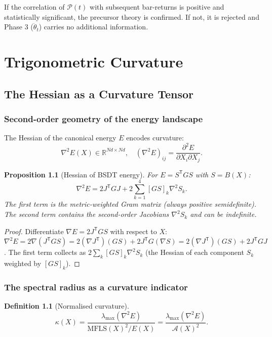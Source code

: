 \documentclass[11pt,a4paper,openany]{book}
\newtheorem{proposition}[theorem]{Proposition}
\theoremstyle{definition}
\newtheorem{definition}[theorem]{Definition}
\newcommand{\R}{\mathbb{R}}
\newcommand{\T}{^{\mathsf{T}}}
\newcommand{\mfls}{\mathrm{MFLS}}
\begin{document}
If the correlation of $\mathcal{P}(t)$ with subsequent bar-returns is positive and
statistically significant, the precursor theory is confirmed.
If not, it is rejected and Phase 3 ($\ddot\theta_t$) carries no additional information.

\part{Trigonometric Curvature}

\chapter{The Hessian as a Curvature Tensor}

\section{Second-order geometry of the energy landscape}

The Hessian of the canonical energy $E$ encodes curvature:
\[
\nabla^2 E(X) \in \R^{Nd\times Nd}, \quad (\nabla^2 E)_{ij} = \frac{\partial^2 E}{\partial X_i\partial X_j}.
\]

\begin{proposition}[Hessian of BSDT energy]
For $E = S\T GS$ with $S = B(X)$:
\[
\nabla^2 E = 2J\T GJ + 2\sum_{k=1}^4 [GS]_k \nabla^2 S_k.
\]
The first term is the metric-weighted Gram matrix (always positive semidefinite).
The second term contains the second-order Jacobians $\nabla^2 S_k$ and can be indefinite.
\end{proposition}

\begin{proof}
Differentiate $\nabla E = 2J\T GS$ with respect to $X$:
$\nabla^2 E = 2\nabla(J\T GS) = 2(\nabla J\T)(GS) + 2J\T G(\nabla S) = 2(\nabla J\T)(GS) + 2J\T GJ$.
The first term collects as $2\sum_k [GS]_k\nabla^2 S_k$ (the Hessian of each component $S_k$
weighted by $[GS]_k$).
\end{proof}

\section{The spectral radius as a curvature indicator}

\begin{definition}[Normalised curvature]
\[
\kappa(X) = \frac{\lambda_\mathrm{max}(\nabla^2 E)}{\mfls(X)^2/E(X)}
= \frac{\lambda_\mathrm{max}(\nabla^2 E)}{\mathcal{A}(X)^2}.
\]
\end{definition}
\end{document}
